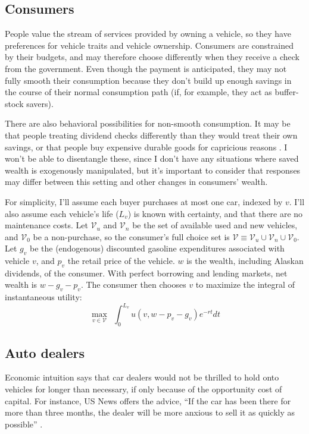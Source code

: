 \documentclass[11pt,letterpaper,oneside]{article}
\begin{document}
\begin{doublespacing}
\subsection{Consumers}

People value the stream of services provided by owning a vehicle, so they have preferences for vehicle traits and vehicle ownership.
Consumers are constrained by their budgets, and may therefore choose differently when they receive a check from the government.
Even though the payment is anticipated, they may not fully smooth their consumption because they don't build up enough savings in the course of their normal consumption path (if, for example, they act as buffer\hyp{}stock savers).

There are also behavioral possibilities for non\hyp{}smooth consumption.
It may be that people treating dividend checks differently than they would treat their own savings, or that people buy expensive durable goods for capricious reasons \parencite{Busse2015_weather_on_cars}.
I won't be able to disentangle these, since I don't have any situations where saved wealth is exogenously manipulated, but it's important to consider that responses may differ between this setting and other changes in consumers' wealth.

For simplicity, I'll assume each buyer purchases at most one car, indexed by $v$.
I'll also assume each vehicle's life ($L_v$) is known with certainty, and that there are no maintenance costs.
Let $\mathcal{V}_u$ and $\mathcal{V}_n$ be the set of available used and new vehicles, and $\mathcal{V}_0$ be a non\hyp{}purchase, so the consumer's full choice set is $\mathcal{V} \equiv \mathcal{V}_u \cup \mathcal{V}_n \cup \mathcal{V}_0$.
Let $g_v$ be the (endogenous) discounted gasoline expenditures associated with vehicle $v$, and $p_v$ the retail price of the vehicle.
$w$ is the wealth, including Alaskan dividends, of the consumer.
With perfect borrowing and lending markets, net wealth is $w - g_v - p_v$.
The consumer then chooses $v$ to maximize the integral of instantaneous utility:
\[
\max_{v \in \mathcal{V}} \ \ \int_0^{L_v} u(v, w - p_v - g_v) e^{-rt} dt
\]

\subsection{Auto dealers}

Economic intuition says that car dealers would not be thrilled to hold onto vehicles for longer than necessary, if only because of the opportunity cost of capital.
For instance, US News offers the advice, ``If the car has been there for more than three months, the dealer will be more anxious to sell it as quickly as possible''
\parencite{usnews_car_deals}.


\end{doublespacing}
\end{document}
